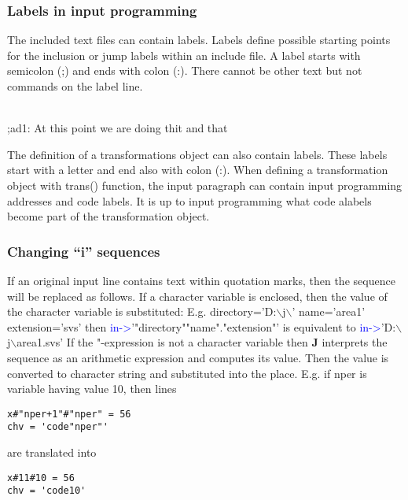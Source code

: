 \subsubsection{Labels in input programming}
\label{inpuad}

The included text files can contain labels. Labels define possible starting points for the
inclusion or jump labels within an include file. A label starts with semicolon (;) and
ends with colon (:). There cannot be other text but not commands on the label line.

\\
;ad1:  At this point we are doing thit and that
\\


\begin{note}
The definition of a transformations object can also contain labels. These labels start
with a letter and end also with colon (:). When defining a transformation object with \textcolor{VioletRed}{trans}() function,
the input paragraph can contain input programming addresses and code labels. It is up to
input programming what code alabels become part of the transformation object.
\end{note}


\subsubsection{Changing “i” sequences}
\label{inpureplace}
If an original input line contains text within quotation marks, then the sequence will be replaced
as follows. If a character variable is enclosed, then the value of the character variable is
substituted: E.g.
directory='D:$\backslash$j$\backslash$'
name='area1'
extension='svs'
then
\textcolor{blue}{in->}'"directory""name"."extension"'
is equivalent to
\textcolor{blue}{in->}'D:$\backslash$j$\backslash$area1.svs'
If the "-expression is not a character variable then \textbf{J} interprets the sequence as an arithmetic
expression and computes its value. Then the value is converted to character string and
substituted into the place. E.g. if nper is variable having value 10, then lines
\color{Green}
\begin{verbatim}
x#"nper+1"#"nper" = 56
chv = 'code"nper"'
\end{verbatim}
\color{Black}
are translated into
\color{Green}
\begin{verbatim}
x#11#10 = 56
chv = 'code10'
\end{verbatim}
\color{Black}

